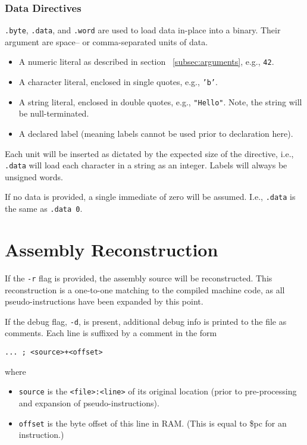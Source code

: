 \documentclass[10pt]{article}
\begin{document}
\subsubsection{Data Directives}

\texttt{.byte}, \texttt{.data}, and \texttt{.word} are used to load data in-place into a binary.
Their argument are space-- or comma-separated units of data.
\begin{itemize}
    \item A numeric literal as described in section ~\ref{subsec:arguments}, e.g., \texttt{42}.
    \item A character literal, enclosed in single quotes, e.g., \texttt{'b'}.
    \item A string literal, enclosed in double quotes, e.g., \texttt{"Hello"}.
    Note, the string will be null-terminated.
    \item A declared label (meaning labels cannot be used prior to declaration here).
\end{itemize}
Each unit will be inserted as dictated by the expected size of the directive, i.e., \texttt{.data} will load each character in a string as an integer.
Labels will always be unsigned words.

If no data is provided, a single immediate of zero will be assumed.
I.e., \texttt{.data} is the same as \texttt{.data 0}.

\section{Assembly Reconstruction}

If the \texttt{-r} flag is provided, the assembly source will be reconstructed.
This reconstruction is a one-to-one matching to the compiled machine code, as all pseudo-instructions have been expanded by this point.

If the debug flag, \texttt{-d}, is present, additional debug info is printed to the file as comments.
Each line is suffixed by a comment in the form

\begin{lstlisting}[style=assembly]
... ; <source>+<offset>
\end{lstlisting}

where
\begin{itemize}
    \item \texttt{source} is the \texttt{<file>:<line>} of its original location (prior to pre-processing and expansion of pseudo-instructions).
    \item \texttt{offset} is the byte offset of this line in RAM.
    (This is equal to \$pc for an instruction.)
\end{itemize}
\end{document}
